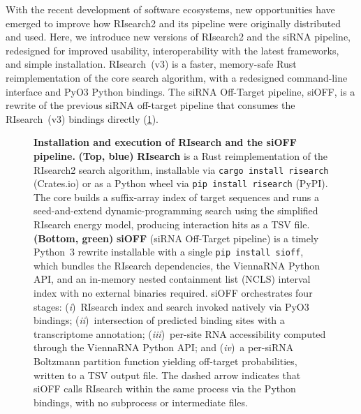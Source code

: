 \documentclass[unnumsec,webpdf,contemporary,large]{oup-authoring-template}
\begin{document}
With the recent development of software ecosystems, new opportunities have emerged to improve how RIsearch2 and its pipeline were originally distributed and used.
Here, we introduce new versions of RIsearch2 and the siRNA pipeline, redesigned for improved usability, interoperability with the latest frameworks, and simple installation.
RIsearch~(v3) is a faster, memory-safe Rust reimplementation of the core search algorithm, with a redesigned command-line interface and PyO3 Python bindings.
The siRNA Off-Target pipeline, siOFF, is a rewrite of the previous siRNA off-target pipeline that consumes the RIsearch~(v3) bindings directly (\cref{fig:summary}).
\begin{figure}[t]
\centering
\resizebox{\linewidth}{!}{}
\caption{
  \textbf{Installation and execution of RIsearch and the siOFF pipeline.}
  \textbf{(Top, blue)} \textbf{RIsearch} is a Rust reimplementation of the RIsearch2 search algorithm, installable via \texttt{cargo install risearch} (Crates.io) or as a Python wheel via \texttt{pip install risearch} (PyPI).
  The core builds a suffix-array index of target sequences and runs a seed-and-extend dynamic-programming search using the simplified RIsearch energy model, producing interaction hits as a TSV file.
  \textbf{(Bottom, green)} \textbf{siOFF} (siRNA Off-Target pipeline) is a timely Python~3 rewrite installable with a single \texttt{pip install sioff}, which bundles the RIsearch dependencies, the ViennaRNA Python API, and an in-memory nested containment list (NCLS) interval index with no external binaries required.
  siOFF orchestrates four stages: (\textit{i})~RIsearch index and search invoked natively via PyO3 bindings; (\textit{ii})~intersection of predicted binding sites with a transcriptome annotation; (\textit{iii})~per-site RNA accessibility computed through the ViennaRNA Python API; and (\textit{iv})~a per-siRNA Boltzmann partition function yielding off-target probabilities, written to a TSV output file.
  The dashed arrow indicates that siOFF calls RIsearch within the same process via the Python bindings, with no subprocess or intermediate files.
}
\label{fig:summary}
\end{figure}
\end{document}
